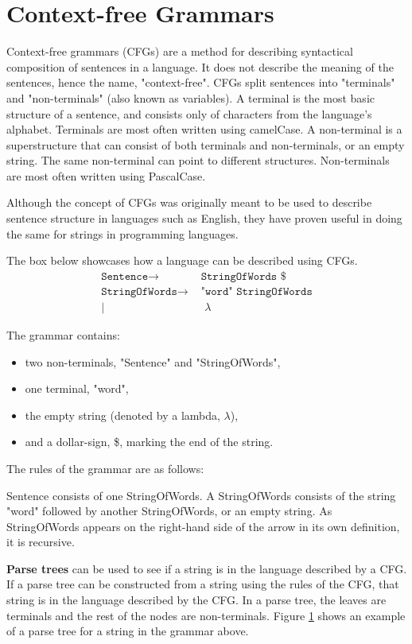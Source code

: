 \section{Context-free Grammars}
Context-free grammars (CFGs) are a method for describing syntactical composition of sentences in a language.
It does not describe the meaning of the sentences, hence the name, "context-free".
CFGs split sentences into "terminals" and "non-terminals" (also known as variables).
A terminal is the most basic structure of a sentence, and consists only of characters from the language's alphabet.
Terminals are most often written using camelCase.
A non-terminal is a superstructure that can consist of both terminals and non-terminals, or an empty string.
The same non-terminal can point to different structures.
Non-terminals are most often written using PascalCase.

Although the concept of CFGs was originally meant to be used to describe sentence structure in languages such as English, they have proven useful in doing the same for strings in programming languages.

The box below showcases how a language can be described using CFGs.
\begin{align*}
	\texttt{Sentence}\to & \texttt{ StringOfWords \$}\\
	\texttt{StringOfWords}\to & \texttt{ "word" StringOfWords}\\
	| & \texttt{ }\lambda
\end{align*}

The grammar contains:
\begin{itemize}
	\item two non-terminals, "Sentence" and "StringOfWords",
	\item one terminal, "word",
	\item the empty string (denoted by a lambda, $\lambda$),
	\item and a dollar-sign, \$, marking the end of the string.
\end{itemize}

The rules of the grammar are as follows:

Sentence consists of one StringOfWords. 
A StringOfWords consists of the string "word" followed by another StringOfWords, or an empty string.
As StringOfWords appears on the right-hand side of the arrow in its own definition, it is recursive.

\textbf{Parse trees} can be used to see if a string is in the language described by a CFG.
If a parse tree can be constructed from a string using the rules of the CFG, that string is in the language described by the CFG. 
In a parse tree, the leaves are terminals and the rest of the nodes are non-terminals.
Figure \ref{} shows an example of a parse tree for a string in the grammar above.

